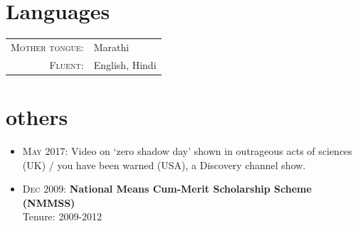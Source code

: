 \documentclass[a4paper,10pt]{article}
\begin{document}
\section{Languages}
\begin{tabular}{rl}
 \textsc{Mother tongue:}& Marathi\\
\textsc{Fluent:}&English, Hindi\\
\end{tabular}

\section{others}
\begin{itemize}
 \item \textsc{May} 2017:  Video on `zero shadow day' shown in outrageous acts of sciences (UK) / you have been warned (USA), a Discovery channel show.

 

\item \textsc{Dec} 2009: \textbf{National Means Cum-Merit Scholarship Scheme (NMMSS)}\\ 
 Tenure: 2009-2012

 \end{itemize}


\end{document}
